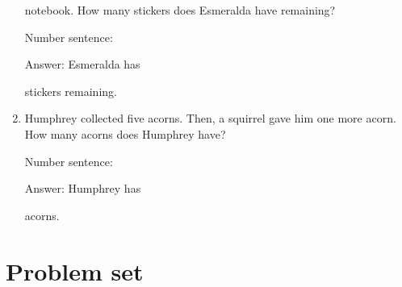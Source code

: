 \documentclass{tufte-book}
\begin{document}
\begin{enumerate}
  notebook. How many stickers does Esmeralda have remaining?\medskip\par
  Number sentence:
  \dotfill\medskip\par
  Answer: Esmeralda has
  \dotfill\medskip\par\mbox{}\dotfill\medskip\par\mbox{}\dotfill\bigskip
  stickers remaining.
\item
  Humphrey collected five acorns. Then, a squirrel gave him one more
  acorn. How many acorns does Humphrey have?\medskip\par
  Number sentence:
  \dotfill\medskip\par
  Answer: Humphrey has
  \dotfill\medskip\par\mbox{}\dotfill\medskip\par\mbox{}\dotfill\bigskip
  acorns.
\end{enumerate}



\clearpage\section{Problem set }
\end{document}
